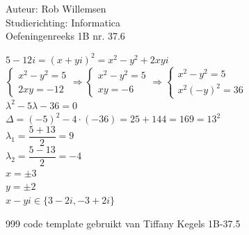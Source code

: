 \documentclass[a4paper]{article}
\begin{document}
  
\noindent \large Auteur: Rob Willemsen \\
\noindent \large Studierichting: Informatica\\
\noindent \large Oefeningenreeks 1B nr. 37.6\\

\medskip

\normalsize

$5-12i = (x+yi)^2 = x^2 - y^2 + 2xyi$\\

$\left\{
	\begin{array}{l}
		x^2 - y^2 = 5\\
		2xy = -12
	\end{array}
\right .
\Rightarrow
\left\{
	\begin{array}{l}
		x^2 - y^2 = 5\\
		xy = -6
	\end{array}
\right .
\Rightarrow
\left\{
	\begin{array}{l}
		x^2 - y^2 = 5\\
		x^2(-y)^2 = 36
	\end{array}
\right .$\\

$\lambda^2 - 5\lambda - 36 = 0$\\

$\Delta = (-5)^2 -4\cdot(-36) = 25 + 144 = 169 = 13^2$\\

$\lambda_1 = \dfrac{5 + 13}{2} = 9$\\

$\lambda_2 = \dfrac{5 - 13}{2} = -4$\\

$x = \pm3$\\

$y = \pm2$\\

$x-yi \in \{3-2i,-3+2i\}$\\

\begin{thebibliography}{999}
 code template gebruikt van Tiffany Kegels 1B-37.5

\end{thebibliography}
\end{document}
